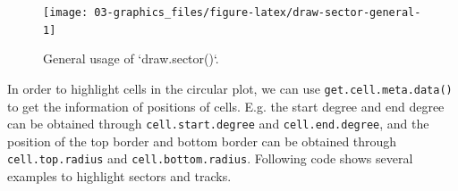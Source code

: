 \documentclass[]{book}
\newenvironment{Shaded}{\begin{snugshade}}{\end{snugshade}}
\newcommand{\KeywordTok}[1]{\textcolor[rgb]{0.13,0.29,0.53}{\textbf{#1}}}
\newcommand{\DataTypeTok}[1]{\textcolor[rgb]{0.13,0.29,0.53}{#1}}
\newcommand{\DecValTok}[1]{\textcolor[rgb]{0.00,0.00,0.81}{#1}}
\newcommand{\FloatTok}[1]{\textcolor[rgb]{0.00,0.00,0.81}{#1}}
\newcommand{\StringTok}[1]{\textcolor[rgb]{0.31,0.60,0.02}{#1}}
\newcommand{\OtherTok}[1]{\textcolor[rgb]{0.56,0.35,0.01}{#1}}
\newcommand{\OperatorTok}[1]{\textcolor[rgb]{0.81,0.36,0.00}{\textbf{#1}}}
\newcommand{\NormalTok}[1]{#1}
\theoremstyle{definition}
\theoremstyle{definition}
\theoremstyle{remark}
\begin{document}
\begin{Shaded}
\end{Shaded}

\begin{figure}

{\centering \texttt{[image: 03-graphics\_files/figure-latex/draw-sector-general-1]} 

}

\caption{General usage of `draw.sector()`.}\label{fig:draw-sector-general}
\end{figure}

In order to highlight cells in the circular plot, we can use
\texttt{get.cell.meta.data()} to get the information of positions of
cells. E.g. the start degree and end degree can be obtained through
\texttt{cell.start.degree} and \texttt{cell.end.degree}, and the
position of the top border and bottom border can be obtained through
\texttt{cell.top.radius} and \texttt{cell.bottom.radius}. Following code
shows several examples to highlight sectors and tracks.
\end{document}
